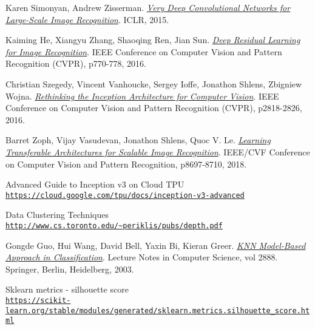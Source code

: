 \begin{thebibliography}{9}
	\hypertarget{SimonyanKarenZissermanAndrew}{} 
	Karen Simonyan, Andrew Zisserman.
	\textit{\href{https://arxiv.org/pdf/1409.1556.pdf}{Very Deep Convolutional Networks for Large-Scale Image Recognition}}.
	 ICLR, 2015.
	 
	\hypertarget{KaimingHeXiangyuZhangShaoqingRenJianSun}{} 
	Kaiming He, Xiangyu Zhang, Shaoqing Ren, Jian Sun.
	\textit{\href{https://arxiv.org/pdf/1512.03385.pdf}{Deep Residual Learning for Image Recognition}}.
	 IEEE Conference on Computer Vision and Pattern Recognition (CVPR), p770-778, 2016.

	\hypertarget{Szegedy2016RethinkingTI}{} 
	Christian Szegedy, Vincent Vanhoucke, Sergey Ioffe, Jonathon Shlens, Zbigniew Wojna.
	\textit{\href{https://arxiv.org/pdf/1512.00567.pdf}{Rethinking the Inception Architecture for Computer Vision}}.
	 IEEE Conference on Computer Vision and Pattern Recognition (CVPR), p2818-2826, 2016.	
	
	\hypertarget{Zoph2018LearningTA}{} 
	Barret Zoph, Vijay Vasudevan, Jonathon Shlens, Quoc V. Le.
	\textit{\href{https://arxiv.org/pdf/1707.07012.pdf}{Learning Transferable Architectures for Scalable Image Recognition}}.
	 IEEE/CVF Conference on Computer Vision and Pattern Recognition, p8697-8710, 2018.	
	
	\hypertarget{guideinceptionv3}{} 
	Advanced Guide to Inception v3 on Cloud TPU
	\\\texttt{\url{https://cloud.google.com/tpu/docs/inception-v3-advanced}}
	
	\hypertarget{dataclusteringtechniques}{} 
	Data Clustering Techniques
	\\\texttt{\url{http://www.cs.toronto.edu/~periklis/pubs/depth.pdf}}
	
	\hypertarget{gongdeguo}{} 
	Gongde Guo, Hui Wang, David Bell, Yaxin Bi, Kieran Greer.
	\textit{\href{http://citeseerx.ist.psu.edu/viewdoc/download?doi=10.1.1.2.815&rep=rep1&type=pdf}{KNN Model-Based Approach in Classification}}.
	Lecture Notes in Computer Science, vol 2888. Springer, Berlin, Heidelberg, 2003.

	\hypertarget{silhouette}{} 
	Sklearn metrics - silhouette score
	\\\texttt{\url{https://scikit-learn.org/stable/modules/generated/sklearn.metrics.silhouette_score.html}}
	

\end{thebibliography}
